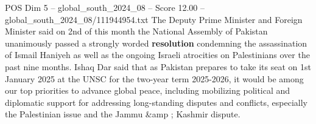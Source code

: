 \begin{textsample}{POS Dim 5 – global\_south\_2024\_08 – Score 12.00 – global\_south\_2024\_08/111944954.txt}
The Deputy Prime Minister and Foreign Minister said on 2nd of this month the National Assembly of Pakistan unanimously passed a strongly worded \textbf{resolution} condemning the assassination of Ismail Haniyeh as well as the ongoing Israeli atrocities on Palestinians over the past nine months.
Ishaq Dar said that as Pakistan prepares to take its seat on 1st January 2025 at the UNSC for the two-year term 2025-2026, it would be among our top priorities to advance global peace, including mobilizing political and diplomatic support for addressing long-standing disputes and conflicts, especially the Palestinian issue and the Jammu \&amp ; Kashmir dispute.

\end{textsample}
